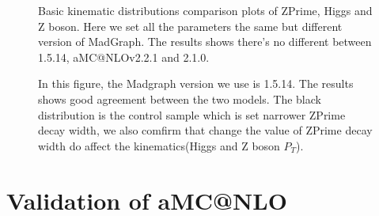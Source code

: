 \documentclass[12pt]{article} %
\begin{document}
\begin{figure}[H] %
  \caption{Basic kinematic distributions comparison plots of ZPrime, Higgs and Z boson. Here we set all the parameters the same but different version of MadGraph. The results shows there's no different between 1.5.14, aMC@NLOv2.2.1 and 2.1.0.}
  \label{fig:oldnewgen}
\end{figure}

\begin{figure}[H] %
  \caption{In this figure, the Madgraph version we use is 1.5.14. The results shows good agreement between the two models. The black distribution is the control sample which is set narrower ZPrime decay width, we also comfirm that change the value of ZPrime decay width do affect the kinematics(Higgs and Z boson $P_{T}$).}
  \label{fig:width}
\end{figure}




\section{Validation of aMC@NLO}
\end{document}
